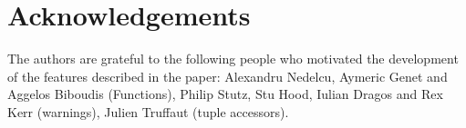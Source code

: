 \section{Acknowledgements}

The authors are grateful to the following people who motivated the development of the features described in the paper: Alexandru Nedelcu, Aymeric Genet and Aggelos Biboudis (Functions), Philip Stutz, Stu Hood, Iulian Dragos and Rex Kerr (warnings), Julien Truffaut (tuple accessors).